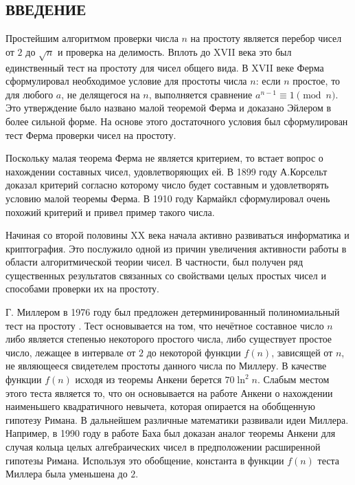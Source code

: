 \documentclass[_dissertation.tex]{subfiles}
\begin{document}
\onlyinsubfile{
    \renewcommand{\contentsname}{ОГЛАВЛЕНИЕ}
    \setcounter{tocdepth}{3}
    \tableofcontents
}

\newpage
\begin{center}
    \section*{ВВЕДЕНИЕ}
\end{center}

Простейшим алгоритмом проверки числа $n$ на простоту является перебор чисел от $2$ до $\sqrt{n}$ и проверка на делимость.
Вплоть до XVII века это был единственный тест на простоту для чисел общего вида.
В XVII веке Ферма сформулировал необходимое условие для простоты числа $n$: если $n$ простое, то для любого $a$, не делящегося на $n$, выполняется сравнение $a^{n-1} \equiv 1{\pmod{n}}$.
Это утверждение было названо малой теоремой Ферма и доказано Эйлером в более сильной форме.
На основе этого достаточного условия был сформулирован тест Ферма проверки чисел на простоту.

Поскольку малая теорема Ферма не является критерием, то встает вопрос о нахождении составных чисел, удовлетворяющих ей.
В 1899 году А.Корсельт доказал критерий согласно которому число будет составным и удовлетворять условию малой теоремы Ферма.
В 1910 году Кармайкл сформулировал очень похожий критерий и привел пример такого числа.

Начиная со второй половины XX века начала активно развиваться информатика и криптография.
Это послужило одной из причин увеличения активности работы в области алгоритмической теории чисел.
В частности, был получен ряд существенных результатов связанных со свойствами целых простых чисел и способами проверки их на простоту.

Г. Миллером в 1976 году был предложен детерминированный полиномиальный тест на простоту \cite{Miller}.
Тест основывается на том, что нечётное составное число $n$ либо является степенью некоторого простого числа, либо существует простое число, лежащее в интервале от $2$ до некоторой функции $f(n)$, зависящей от $n$, не являющееся свидетелем простоты данного числа по Миллеру.
В качестве функции $f(n)$ исходя из теоремы Анкени берется $70 \ln^2 n$.
Слабым местом этого теста является то, что он основывается на работе Анкени о нахождении наименьшего квадратичного невычета, которая опирается на обобщенную гипотезу Римана.
В дальнейшем различные математики развивали идеи Миллера.
Например, в 1990 году в работе Баха \cite{Bach} был доказан аналог теоремы Анкени для случая кольца целых алгебраических чисел в предположении расширенной гипотезы Римана.
Используя это обобщение, константа в функции $f(n)$ теста Миллера была уменьшена до $2$.
\end{document}
